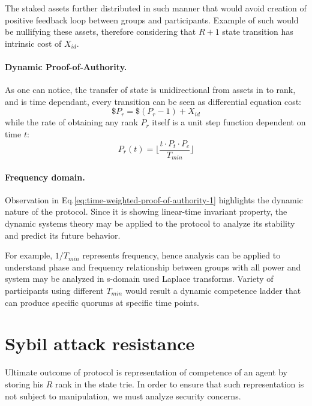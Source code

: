 \documentclass{article}
\begin{document}
\begin{CJK}{UTF8}{gbsn}
    The staked assets further distributed in such manner that would avoid creation of positive feedback loop between groups and participants. Example of such would be nullifying these assets, therefore considering that $R+1$ state transition has intrinsic cost of $X_{id}$.


    \paragraph{Dynamic Proof-of-Authority.} As one can notice, the transfer of state is unidirectional from assets in to rank, and is time dependant, every transition can be seen as differential equation cost:
    \begin{equation}
        \label{eq:time-weighted-proof-of-authority}
        \$P_r = \$(P_r-1) + X_{id}
    \end{equation}
    while the rate of obtaining any rank $P_r$ itself is a unit step function dependent on time $t$:
    \begin{equation}
        \label{eq:time-weighted-proof-of-authority-1}
        P_r(t) = \lfloor \dfrac{t \cdot P_t \cdot P_c}{T_{min}} \rfloor
    \end{equation}

    \paragraph*{Frequency domain.}Observation in Eq.\ref{eq:time-weighted-proof-of-authority-1} highlights the dynamic nature of the protocol. Since it is showing linear-time invariant property, the dynamic systems theory\cite{Lynn86} may be applied to the protocol to analyze its stability and predict its future behavior.

    For example, $1/T_{min}$ represents frequency, hence analysis can be applied to understand phase and frequency relationship between groups with all power and system may be analyzed in s-domain used Laplace transforms. Variety of participants using different ${T_{min}}$ would result a dynamic competence ladder that can produce specific quorums at specific time points.



    \section{Sybil attack resistance}
    Ultimate outcome of protocol is representation of competence of an agent by storing his $R$ rank in the state trie. In order to ensure that such representation is not subject to manipulation, we must analyze security concerns.


\end{CJK}
\end{document}
